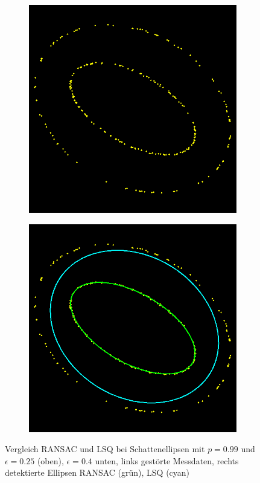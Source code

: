 \begin{figure}[!htb]
\begin{subfigure}{.5\textwidth}
	\end{subfigure}
	\begin{subfigure}{.5\textwidth}
		\centering
		\vspace{0.2cm}
		\includegraphics[width=.9\textwidth]{images/ransacShadow40_0.png}
	\end{subfigure}%
	\begin{subfigure}{.5\textwidth}
		\centering
		\vspace{0.2cm}
		\includegraphics[width=.9\textwidth]{images/ransacShadow40_1.png}
	\end{subfigure}
	\caption{Vergleich RANSAC und LSQ bei Schattenellipsen mit $p = 0.99$ und $\epsilon = 0.25$ (oben), $\epsilon = 0.4$ unten, links gestörte Messdaten, rechts detektierte Ellipsen RANSAC (grün), LSQ (cyan)}
	\label{fig:blubb}
\end{figure}























